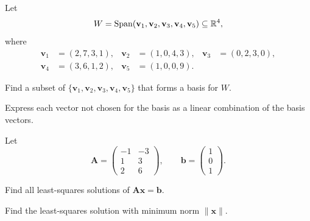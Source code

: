 \documentclass[11pt,oneside]{article}
\begin{document}
\begin{problem}
Let
\[
W=\operatorname{Span}(\mathbf v_1,\mathbf v_2,\mathbf v_3,\mathbf v_4,\mathbf v_5)\subseteq\mathbb{R}^4,
\]
where
\[
\begin{aligned}
\mathbf v_1&=(2,7,3,1),&
\mathbf v_2&=(1,0,4,3),&
\mathbf v_3&=(0,2,3,0),\\
\mathbf v_4&=(3,6,1,2),&
\mathbf v_5&=(1,0,0,9).
\end{aligned}
\]
\begin{problemsubparts}
\item Find a subset of $\{\mathbf v_1,\mathbf v_2,\mathbf v_3,\mathbf v_4,\mathbf v_5\}$ that forms a basis for $W$.
\item Express each vector not chosen for the basis as a linear combination of the basis vectors.
\end{problemsubparts}
\end{problem}

\begin{problem}
Let
\[
\mathbf A=
\begin{pmatrix}
-1&-3\\
1&3\\
2&6
\end{pmatrix},
\qquad
\mathbf b=
\begin{pmatrix}1\\0\\1\end{pmatrix}.
\]
\begin{problemsubparts}
\item Find all least-squares solutions of $\mathbf A\mathbf x=\mathbf b$.
\item Find the least-squares solution with minimum norm $\|\mathbf x\|$.
\end{problemsubparts}
\end{problem}
\end{document}
